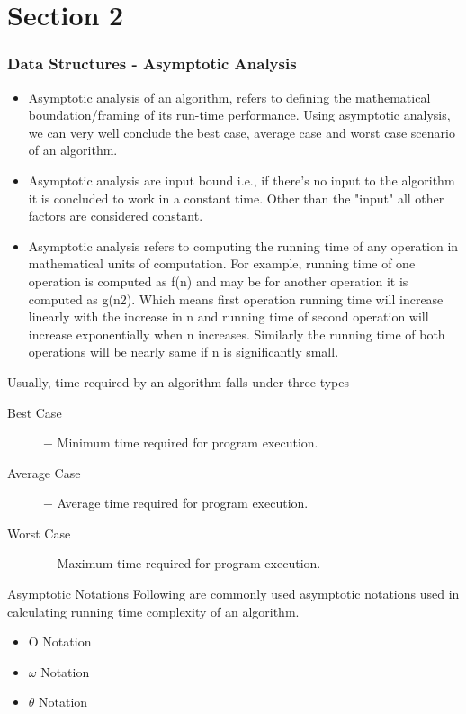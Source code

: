 \documentclass{beamer}
\begin{document}
\section{Section 2}
\begin{frame}
\frametitle{Data Structures - Asymptotic Analysis}
 
 \begin{itemize}
\item Asymptotic analysis of an algorithm, refers to defining the mathematical boundation/framing of its run-time performance. Using asymptotic analysis, we can very well conclude the best case, average case and worst case scenario of an algorithm.
\item 
Asymptotic analysis are input bound i.e., if there's no input to the algorithm it is concluded to work in a constant time. Other than the "input" all other factors are considered constant.
\item 
Asymptotic analysis refers to computing the running time of any operation in mathematical units of computation. For example, running time of one operation is computed as f(n) and may be for another operation it is computed as g(n2). Which means first operation running time will increase linearly with the increase in n and running time of second operation will increase exponentially when n increases. Similarly the running time of both operations will be nearly same if n is significantly small.
\end{itemize}
\end{frame}
\begin{frame}

Usually, time required by an algorithm falls under three types −
\begin{description}
\item[Best Case] − Minimum time required for program execution.

\item[Average Case] − Average time required for program execution.

\item[Worst Case] − Maximum time required for program execution.
\end{description}
\end{frame}
\begin{frame}
Asymptotic Notations
Following are commonly used asymptotic notations used in calculating running time complexity of an algorithm.

\begin{itemize}
\item Ο Notation
\item $\omega$ Notation
\item $\theta$ Notation
\end{itemize}
\end{frame}
\end{document}
